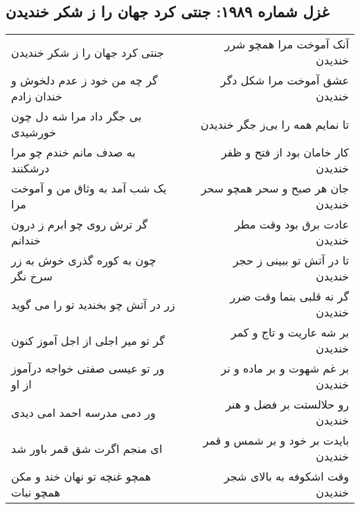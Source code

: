 \begin{center}
\section*{غزل شماره ۱۹۸۹: جنتی کرد جهان را ز شکر خندیدن}
\label{sec:1989}
\begin{longtable}{l p{0.5cm} r}
جنتی کرد جهان را ز شکر خندیدن
&&
آنک آموخت مرا همچو شرر خندیدن
\\
گر چه من خود ز عدم دلخوش و خندان زادم
&&
عشق آموخت مرا شکل دگر خندیدن
\\
بی جگر داد مرا شه دل چون خورشیدی
&&
تا نمایم همه را بی‌ز جگر خندیدن
\\
به صدف مانم خندم چو مرا درشکنند
&&
کار خامان بود از فتح و ظفر خندیدن
\\
یک شب آمد به وثاق من و آموخت مرا
&&
جان هر صبح و سحر همچو سحر خندیدن
\\
گر ترش روی چو ابرم ز درون خندانم
&&
عادت برق بود وقت مطر خندیدن
\\
چون به کوره گذری خوش به زر سرخ نگر
&&
تا در آتش تو ببینی ز حجر خندیدن
\\
زر در آتش چو بخندید تو را می گوید
&&
گر نه قلبی بنما وقت ضرر خندیدن
\\
گر تو میر اجلی از اجل آموز کنون
&&
بر شه عاریت و تاج و کمر خندیدن
\\
ور تو عیسی صفتی خواجه درآموز از او
&&
بر غم شهوت و بر ماده و نر خندیدن
\\
ور دمی مدرسه احمد امی دیدی
&&
رو حلالستت بر فضل و هنر خندیدن
\\
ای منجم اگرت شق قمر باور شد
&&
بایدت بر خود و بر شمس و قمر خندیدن
\\
همچو غنچه تو نهان خند و مکن همچو نبات
&&
وقت اشکوفه به بالای شجر خندیدن
\\
\end{longtable}
\end{center}
